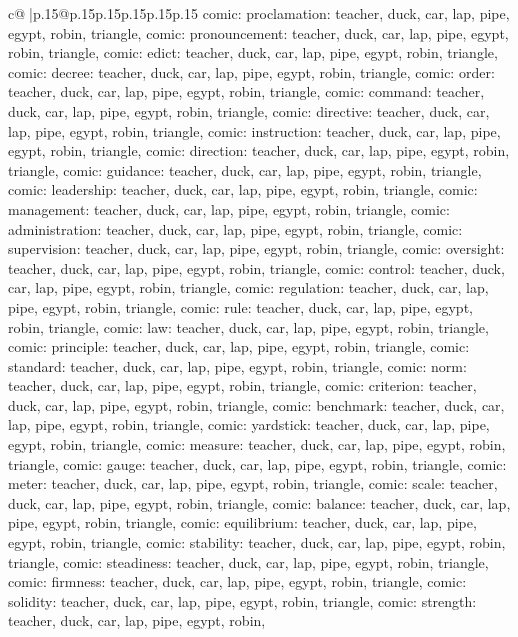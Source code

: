 \documentclass{article}
\begin{document}
{\begin{supertabular}{c@{$\;$}|p{.15\linewidth}@{}p{.15\linewidth}p{.15\linewidth}p{.15\linewidth}p{.15\linewidth}p{.15\linewidth}}
{{{comic\n\nCLUE: proclamation\nTARGETS: teacher, duck, car, lap, pipe, egypt, robin, triangle, comic\n\nCLUE: pronouncement\nTARGETS: teacher, duck, car, lap, pipe, egypt, robin, triangle, comic\n\nCLUE: edict\nTARGETS: teacher, duck, car, lap, pipe, egypt, robin, triangle, comic\n\nCLUE: decree\nTARGETS: teacher, duck, car, lap, pipe, egypt, robin, triangle, comic\n\nCLUE: order\nTARGETS: teacher, duck, car, lap, pipe, egypt, robin, triangle, comic\n\nCLUE: command\nTARGETS: teacher, duck, car, lap, pipe, egypt, robin, triangle, comic\n\nCLUE: directive\nTARGETS: teacher, duck, car, lap, pipe, egypt, robin, triangle, comic\n\nCLUE: instruction\nTARGETS: teacher, duck, car, lap, pipe, egypt, robin, triangle, comic\n\nCLUE: direction\nTARGETS: teacher, duck, car, lap, pipe, egypt, robin, triangle, comic\n\nCLUE: guidance\nTARGETS: teacher, duck, car, lap, pipe, egypt, robin, triangle, comic\n\nCLUE: leadership\nTARGETS: teacher, duck, car, lap, pipe, egypt, robin, triangle, comic\n\nCLUE: management\nTARGETS: teacher, duck, car, lap, pipe, egypt, robin, triangle, comic\n\nCLUE: administration\nTARGETS: teacher, duck, car, lap, pipe, egypt, robin, triangle, comic\n\nCLUE: supervision\nTARGETS: teacher, duck, car, lap, pipe, egypt, robin, triangle, comic\n\nCLUE: oversight\nTARGETS: teacher, duck, car, lap, pipe, egypt, robin, triangle, comic\n\nCLUE: control\nTARGETS: teacher, duck, car, lap, pipe, egypt, robin, triangle, comic\n\nCLUE: regulation\nTARGETS: teacher, duck, car, lap, pipe, egypt, robin, triangle, comic\n\nCLUE: rule\nTARGETS: teacher, duck, car, lap, pipe, egypt, robin, triangle, comic\n\nCLUE: law\nTARGETS: teacher, duck, car, lap, pipe, egypt, robin, triangle, comic\n\nCLUE: principle\nTARGETS: teacher, duck, car, lap, pipe, egypt, robin, triangle, comic\n\nCLUE: standard\nTARGETS: teacher, duck, car, lap, pipe, egypt, robin, triangle, comic\n\nCLUE: norm\nTARGETS: teacher, duck, car, lap, pipe, egypt, robin, triangle, comic\n\nCLUE: criterion\nTARGETS: teacher, duck, car, lap, pipe, egypt, robin, triangle, comic\n\nCLUE: benchmark\nTARGETS: teacher, duck, car, lap, pipe, egypt, robin, triangle, comic\n\nCLUE: yardstick\nTARGETS: teacher, duck, car, lap, pipe, egypt, robin, triangle, comic\n\nCLUE: measure\nTARGETS: teacher, duck, car, lap, pipe, egypt, robin, triangle, comic\n\nCLUE: gauge\nTARGETS: teacher, duck, car, lap, pipe, egypt, robin, triangle, comic\n\nCLUE: meter\nTARGETS: teacher, duck, car, lap, pipe, egypt, robin, triangle, comic\n\nCLUE: scale\nTARGETS: teacher, duck, car, lap, pipe, egypt, robin, triangle, comic\n\nCLUE: balance\nTARGETS: teacher, duck, car, lap, pipe, egypt, robin, triangle, comic\n\nCLUE: equilibrium\nTARGETS: teacher, duck, car, lap, pipe, egypt, robin, triangle, comic\n\nCLUE: stability\nTARGETS: teacher, duck, car, lap, pipe, egypt, robin, triangle, comic\n\nCLUE: steadiness\nTARGETS: teacher, duck, car, lap, pipe, egypt, robin, triangle, comic\n\nCLUE: firmness\nTARGETS: teacher, duck, car, lap, pipe, egypt, robin, triangle, comic\n\nCLUE: solidity\nTARGETS: teacher, duck, car, lap, pipe, egypt, robin, triangle, comic\n\nCLUE: strength\nTARGETS: teacher, duck, car, lap, pipe, egypt, robin, }}}
\end{supertabular}}
\end{document}
